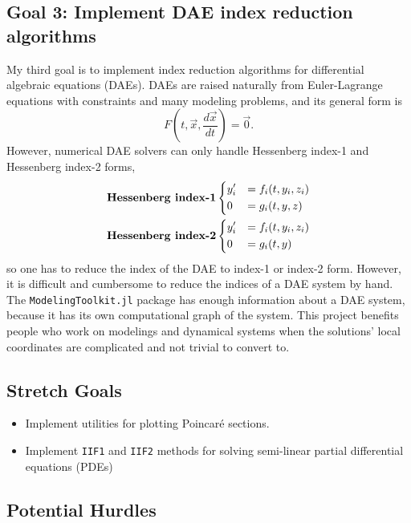\documentclass[12pt,a4paper]{article}
\begin{document}
\subsection{Goal 3: Implement DAE index reduction algorithms}
My third goal is to implement index reduction algorithms for differential
algebraic equations (DAEs). DAEs are raised naturally from Euler-Lagrange
equations with constraints and many modeling problems, and its general form is
\begin{equation}
  F(t, \vec{x}, \frac{d\vec{x}}{dt}) = \vec{0}.
\end{equation}
However, numerical DAE solvers can only handle Hessenberg index-1 and
Hessenberg index-2 forms,
\begin{align}
  &\textbf{Hessenberg index-1}
  \begin{dcases}
    y_i' &= f_i(t,y_i,z_i)\\
    0 &= g_i(t,y,z)
  \end{dcases}\\
  &\textbf{Hessenberg index-2}
  \begin{dcases}
    y'_i &= f_i(t,y_i,z_i)\\
    0 &= g_i(t,y)
  \end{dcases}
\end{align}
so one has to reduce the index of the DAE to index-1 or index-2 form. However,
it is difficult and cumbersome to reduce the indices of a DAE system by hand.
The \texttt{ModelingToolkit.jl} package has enough information about a DAE system,
because it has its own computational graph of the system. This project benefits
people who work on modelings and dynamical systems when the solutions' local
coordinates are complicated and not trivial to convert to.

\subsection{Stretch Goals}
\begin{itemize}
  \item Implement utilities for plotting Poincar\'e sections.
  \item Implement \texttt{IIF1} and \texttt{IIF2} methods for solving
    semi-linear partial differential equations (PDEs)
\end{itemize}

\subsection{Potential Hurdles}
\end{document}

